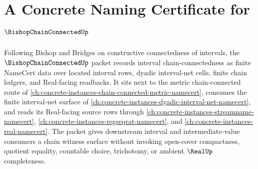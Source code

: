 \chapter{A Concrete Naming Certificate for $\BishopChainConnectedUp$}
\label{ch:concrete-instances-bishop-chain-connected-namecert}

Following Bishop and Bridges on constructive connectedness of intervals, the $\BishopChainConnectedUp$ packet records interval chain-connectedness as finite NameCert data over located interval rows, dyadic interval-net cells, finite chain ledgers, and Real-facing readbacks. It sits next to the metric chain-connected route of \autoref{ch:concrete-instances-chain-connected-metric-namecert}, consumes the finite interval-net surface of \autoref{ch:concrete-instances-dyadic-interval-net-namecert}, and reads its Real-facing source rows through \autoref{ch:concrete-instances-streamname-namecert}, \autoref{ch:concrete-instances-regseqrat-namecert}, and \autoref{ch:concrete-instances-real-namecert}. The packet gives downstream interval and intermediate-value consumers a chain witness surface without invoking open-cover compactness, quotient equality, countable choice, trichotomy, or ambient $\RealUp$ completeness.

